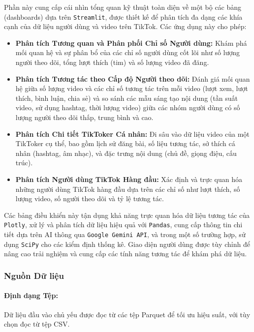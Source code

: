 Phần này cung cấp cái nhìn tổng quan kỹ thuật toàn diện về một bộ các bảng (dashboards) dựa trên \texttt{Streamlit}, được thiết kế để phân tích đa dạng các khía cạnh của dữ liệu người dùng và video trên TikTok. Các ứng dụng này cho phép:

\begin{itemize}
    \item \textbf{Phân tích Tương quan và Phân phối Chỉ số Người dùng:} Khám phá mối quan hệ và sự phân bổ của các chỉ số người dùng cốt lõi như số lượng người theo dõi, tổng lượt thích (tim) và số lượng video đã đăng.
    \item \textbf{Phân tích Tương tác theo Cấp độ Người theo dõi:} Đánh giá mối quan hệ giữa số lượng video và các chỉ số tương tác trên mỗi video (lượt xem, lượt thích, bình luận, chia sẻ) và so sánh các mẫu sáng tạo nội dung (tần suất video, sử dụng hashtag, thời lượng video) giữa các nhóm người dùng có số lượng người theo dõi thấp, trung bình và cao.
    \item \textbf{Phân tích Chi tiết TikToker Cá nhân:} Đi sâu vào dữ liệu video của một TikToker cụ thể, bao gồm lịch sử đăng bài, số liệu tương tác, sở thích cá nhân (hashtag, âm nhạc), và đặc trưng nội dung (chủ đề, giọng điệu, cấu trúc).
    \item \textbf{Phân tích Người dùng TikTok Hàng đầu:} Xác định và trực quan hóa những người dùng TikTok hàng đầu dựa trên các chỉ số như lượt thích, số lượng video, số người theo dõi và tỷ lệ tương tác.
\end{itemize}

Các bảng điều khiển này tận dụng khả năng trực quan hóa dữ liệu tương tác của \texttt{Plotly}, xử lý và phân tích dữ liệu hiệu quả với \texttt{Pandas}, cung cấp thông tin chi tiết dựa trên AI thông qua \texttt{Google Gemini API}, và trong một số trường hợp, sử dụng \texttt{SciPy} cho các kiểm định thống kê. Giao diện người dùng được tùy chỉnh để nâng cao trải nghiệm và cung cấp các tính năng tương tác để khám phá dữ liệu.



\subsubsection{Nguồn Dữ liệu}

\paragraph{Định dạng Tệp:}
Dữ liệu đầu vào chủ yếu được đọc từ các tệp Parquet để tối ưu hiệu suất, với tùy chọn đọc từ tệp CSV.

